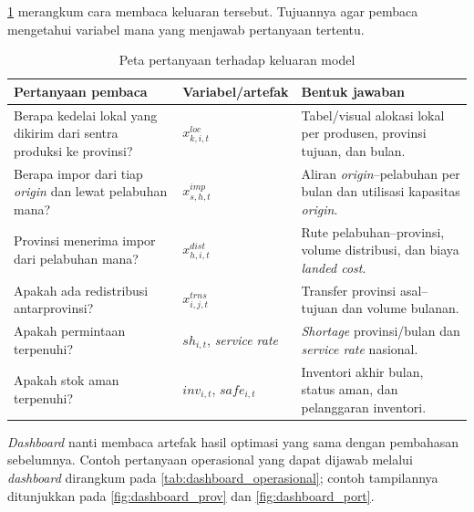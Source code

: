 \documentclass{file/TA-ITS}
\theoremstyle{definition}
\theoremstyle{definition}
\theoremstyle{plain}
\begin{document}
\ref{tab:hasil_question_map} merangkum cara membaca keluaran tersebut. Tujuannya agar pembaca mengetahui variabel mana yang menjawab pertanyaan tertentu.

\begin{table}[H]
\centering
\caption{Peta pertanyaan terhadap keluaran model}
\label{tab:hasil_question_map}
\small
\begin{tabularx}{\textwidth}{@{}p{}p{}X@{}}
\toprule
\textbf{Pertanyaan pembaca} & \textbf{Variabel/artefak} & \textbf{Bentuk jawaban} \\
\midrule
Berapa kedelai lokal yang dikirim dari sentra produksi ke provinsi? & $x^{loc}_{k,i,t}$ & Tabel/visual alokasi lokal per produsen, provinsi tujuan, dan bulan. \\
Berapa impor dari tiap \textit{origin} dan lewat pelabuhan mana? & $x^{imp}_{s,h,t}$ & Aliran \textit{origin}--pelabuhan per bulan dan utilisasi kapasitas \textit{origin}. \\
Provinsi menerima impor dari pelabuhan mana? & $x^{dist}_{h,i,t}$ & Rute pelabuhan--provinsi, volume distribusi, dan biaya \textit{landed cost}. \\
Apakah ada redistribusi antarprovinsi? & $x^{trns}_{i,j,t}$ & Transfer provinsi asal--tujuan dan volume bulanan. \\
Apakah permintaan terpenuhi? & $sh_{i,t}$, \textit{service rate} & \textit{Shortage} provinsi/bulan dan \textit{service rate} nasional. \\
Apakah stok aman terpenuhi? & $inv_{i,t}$, $safe_{i,t}$ & Inventori akhir bulan, status aman, dan pelanggaran inventori. \\
\bottomrule
\end{tabularx}
\end{table}
\textit{Dashboard} nanti membaca artefak hasil optimasi yang sama dengan pembahasan sebelumnya. Contoh pertanyaan operasional yang dapat dijawab melalui \textit{dashboard} dirangkum pada \ref{tab:dashboard_operasional}; contoh tampilannya ditunjukkan pada \ref{fig:dashboard_prov} dan \ref{fig:dashboard_port}.
\end{document}
